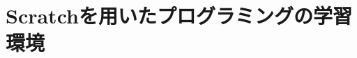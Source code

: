 \documentclass[11pt,dvipdfmx]{jreport}
\begin{document}



\chapter{Scratchを用いたプログラミングの学習環境}
\end{document}
